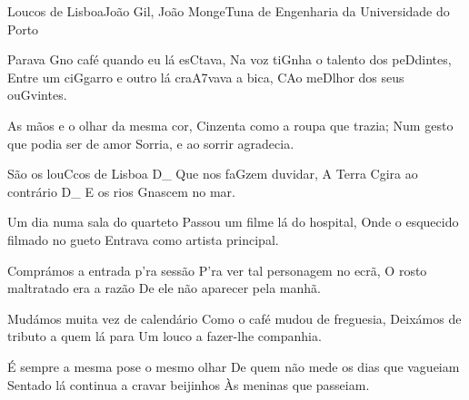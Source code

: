 \begin{musica}{Loucos de Lisboa}{João Gil, João Monge}{Tuna de Engenharia da Universidade do Porto}

Parava \ac{G}{no} café quando eu lá es\ac{C}{ta}va,
Na voz ti\ac{G}{nha} o talento dos pe\ac{D}{din}tes,
Entre um ci\ac{G}{ga}rro e outro lá cra\ac{A7}{va}va a bica,
\ac{C}{Ao} me\ac{D}{lhor} dos seus ou\ac{G}{vin}tes.

As mãos e o olhar da mesma cor,
Cinzenta como a roupa que trazia;
Num gesto que podia ser de amor
Sorria, e ao sorrir agradecia.

São os lou\ac{C}{cos} de Lisboa \ac{D}{}_
Que nos fa\ac{G}{zem} duvidar,
A Terra \ac{C}{gi}ra ao contrário \ac{D}{}_
E os rios \ac{G}{nas}cem no mar.


Um dia numa sala do quarteto
Passou um filme lá do hospital,
Onde o esquecido filmado no gueto
Entrava como artista principal.

Comprámos a entrada p'ra sessão
P'ra ver tal personagem no ecrã,
O rosto maltratado era a razão
De ele não aparecer pela manhã.



Mudámos muita vez de calendário
Como o café mudou de freguesia,
Deixámos de tributo a quem lá para
Um louco a fazer-lhe companhia.

É sempre a mesma pose o mesmo olhar
De quem não mede os dias que vagueiam
Sentado lá continua a cravar beijinhos
Às meninas que passeiam.





\end{musica}
